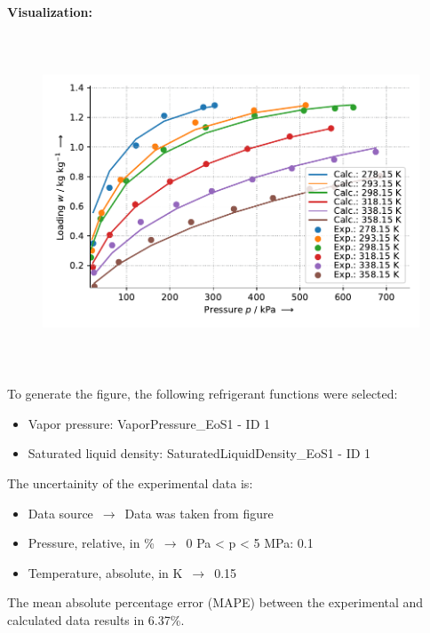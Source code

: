 \textbf{Visualization:}
%
\begin{figure}[!htp]
{\noindent\includegraphics[height=10cm, keepaspectratio]{figs/ads/ads_R-134a_activated_carbon_fiber_A-20_DubininAstakhov_3.pdf}}
\end{figure}
%

To generate the figure, the following refrigerant functions were selected:
\begin{itemize}
\item Vapor pressure: VaporPressure\_EoS1 - ID 1
\item Saturated liquid density: SaturatedLiquidDensity\_EoS1 - ID 1
\end{itemize}

The uncertainity of the experimental data is:
\begin{itemize}
\item Data source $\,\to\,$ Data was taken from figure
\item Pressure, relative, in \% $\,\to\,$ 0 Pa < p < 5 MPa: 0.1%
\item Temperature, absolute, in $\si{\kelvin}$ $\,\to\,$ 0.15
\end{itemize}

The mean absolute percentage error (MAPE) between the experimental and calculated data results in 6.37\%.
\FloatBarrier
\newpage
